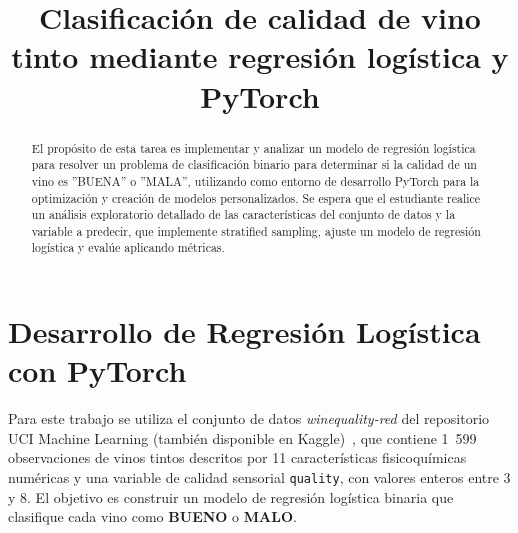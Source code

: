 \documentclass[conference]{IEEEtran}
\begin{document}
\title{Clasificación de calidad de vino tinto mediante regresión logística y PyTorch}

\author{
\and
{}
\and
{}
}

\maketitle

\begin{abstract}
El propósito de esta tarea es implementar y analizar un
modelo de regresión logística para resolver un problema de
clasificación binario para determinar si la calidad de un
vino es ”BUENA” o ”MALA”, utilizando como entorno de
desarrollo PyTorch para la optimización y creación de modelos
personalizados.
Se espera que el estudiante realice un análisis exploratorio
detallado de las características del conjunto de datos y la
variable a predecir, que implemente stratified sampling, ajuste
un modelo de regresión logística y evalúe aplicando métricas.
\end{abstract}

\section{Desarrollo de Regresión Logística con PyTorch}

Para este trabajo se utiliza el conjunto de datos \textit{winequality-red} del repositorio UCI Machine Learning (también disponible en Kaggle)~\cite{b3}, que
contiene 1~599 observaciones de vinos tintos descritos por 11 características
fisicoquímicas numéricas y una variable de calidad sensorial
\texttt{quality}, con valores enteros entre 3 y 8. El objetivo es construir un
modelo de regresión logística binaria que clasifique cada vino como
\textbf{BUENO} o \textbf{MALO}.
\end{document}
